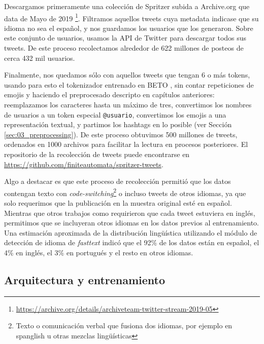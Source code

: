 Descargamos primeramente una colección de Spritzer subida a Archive.org que data de Mayo de 2019 \footnote{\url{https://archive.org/details/archiveteam-twitter-stream-2019-05}}. Filtramos aquellos tweets cuya metadata indicase que su idioma no sea el español, y nos guardamos los usuarios que los generaron. Sobre este conjunto de usuarios, usamos la API de Twitter para descargar todos sus tweets. De este proceso recolectamos alrededor de 622 millones de posteos de cerca 432 mil usuarios.

Finalmente, nos quedamos sólo con aquellos tweets que tengan 6 o más tokens, usando para esto el tokenizador entrenado en BETO \cite{canete2020spanish}, sin contar repeticiones de emojis y haciendo el preprocesado descripto en capítulos anteriores: reemplazamos los caracteres hasta un máximo de tres, convertimos los nombres de usuarios a un token especial \verb|@usuario|, convertimos los emojis a una representación textual, y partimos los hashtags en lo posible (ver Sección \ref{sec:03_preprocessing}). De este proceso obtuvimos 500 millones de tweets, ordenados en \num{1000} archivos para facilitar la lectura en procesos posteriores. El repositorio de la recolección de tweets puede encontrarse en \url{https://github.com/finiteautomata/spritzer-tweets}.

Algo a destacar es que este proceso de recolección permitió que los datos contengan texto con \emph{code-switching}\footnote{Texto o comunicación verbal que fusiona dos idiomas, por ejemplo en spanglish u otras mezclas lingüísticas} o incluso tweets de otros idiomas, ya que solo requerimos que la publicación en la muestra original esté en español. Mientras que otros trabajos como \citet{dat2020bertweet} requirieron que cada tweet estuviera en inglés, permitimos que se incluyeran otros idiomas en los datos previos al entrenamiento. Una estimación aproximada de la distribución lingüística utilizando el módulo de detección de idioma de \emph{fasttext} \cite{joulin2017bag} indicó que el 92\% de los datos están en español, el 4\% en inglés, el 3\% en portugués y el resto en otros idiomas.


\subsection{Arquitectura y entrenamiento}

